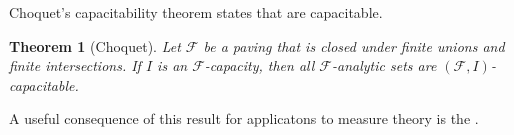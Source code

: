 \documentclass[12pt]{article}
\newtheorem*{theorem*}{Theorem}
\begin{document}

Choquet's capacitability theorem states that  are capacitable.

\begin{theorem*}[Choquet]
Let $\mathcal{F}$ be a paving that is closed under finite unions and finite intersections. If $I$ is an $\mathcal{F}$-capacity, then all $\mathcal{F}$-analytic sets are $(\mathcal{F},I)$-capacitable.
\end{theorem*}

A useful consequence of this result for applicatons to measure theory is the .

\end{document}
